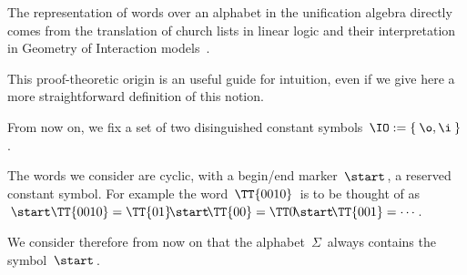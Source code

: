 The representation of words over an alphabet in the unification algebra directly comes from the translation of church lists in linear logic and their interpretation in Geometry of Interaction models~\cite{girard_geometry_1989,girard_geometry_1995}.

This proof-theoretic origin is an useful guide for intuition, even if we give here a more straightforward definition of this notion.

\medskip
From now on, we fix a set of two disinguished constant symbols $\,\IO:=\{\:\o,\i\:\}\,$.


The words we consider are cyclic, with a begin/end marker $\,\start\,$, a reserved constant symbol.
For example the word $\,\TT{0010}\,$ is to be thought of as $\,\start\TT{0010}=\TT{01}\!\start\!\TT{00}=\TT0\!\start\!\TT{001}=\cdots\,$.

We consider therefore from now on that the alphabet $\,\Sigma\,$ always contains the symbol $\,\start\,$.

